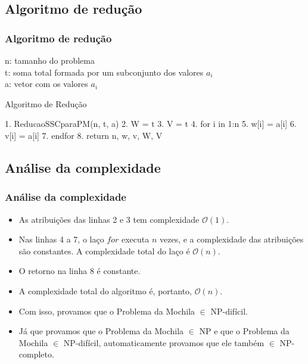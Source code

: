 \documentclass{beamer}
\begin{document}
\subsection{Algoritmo de redução}
\begin{frame}[fragile]
\frametitle{Algoritmo de redução}
    n: tamanho do problema \\
    t: soma total formada por um subconjunto dos valores $a_{i}$ \\
    a: vetor com os valores $a_{i}$ \\
    \begin{block}{Algoritmo de Redução}
        \begin{semiverbatim}
        1. ReducaoSSCparaPM(n, t, a)
        2.    W = t
        3.    V = t
        4.    for i in 1:n
        5.        w[i] = a[i]
        6.        v[i] = a[i]
        7.    endfor
        8.    return n, w, v, W, V
        \end{semiverbatim}
    \end{block}
\end{frame}

\subsection{Análise da complexidade}
\begin{frame}
\frametitle{Análise da complexidade}
    \begin{itemize}
        \item As atribuições das linhas 2 e 3 tem complexidade $\mathcal{O}(1)$.

        \item Nas linhas 4 a 7, o laço $for$ executa $n$ vezes, e a complexidade das atribuições são constantes.
            A complexidade total do laço é $\mathcal{O}(n)$.
        \item O retorno na linha 8 é constante.
        \item A complexidade total do algoritmo é, portanto, $\mathcal{O}(n)$.
        \item Com isso, provamos que o Problema da Mochila $\in$ NP-difícil.
        
        \item Já que provamos que o Problema da Mochila $\in$ NP e que o Problema da Mochila $\in$ NP-difícil, automaticamente provamos que ele também $\in$ NP-completo.
    \end{itemize}
\end{frame}
\end{document}

